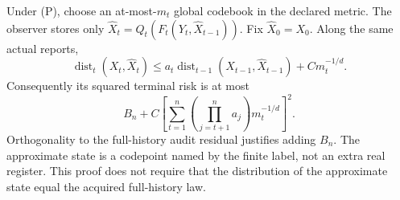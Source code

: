 Under (P), choose an at-most-$m_t$ global codebook in the declared metric. The observer stores only $\widehat X_t=Q_t(F_t(Y_t,\widehat X_{t-1}))$. Fix $\widehat X_0=X_0$. Along the same actual reports,
\[
 \operatorname{dist}_t(X_t,\widehat X_t)
 \le a_t\operatorname{dist}_{t-1}(X_{t-1},\widehat X_{t-1})+C m_t^{-1/d}.
\]
Consequently its squared terminal risk is at most
\begin{equation}\label{eq:pathwise-recursion}
 B_n+C\left[\sum_{t=1}^n
     \left(\prod_{j=t+1}^n a_j\right)m_t^{-1/d}\right]^2.
\end{equation}
Orthogonality to the full-history audit residual justifies adding $B_n$. The approximate state is a codepoint named by the finite label, not an extra real register. This proof does not require that the distribution of the approximate state equal the acquired full-history law.

